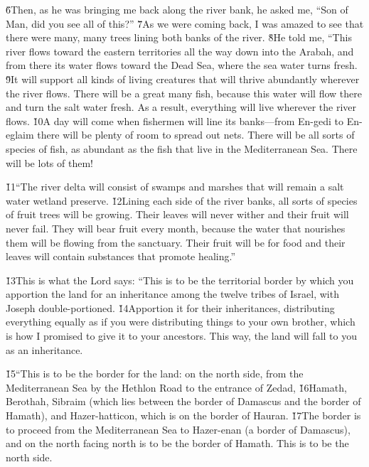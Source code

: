 \v{6}Then, as he was bringing me back along the river bank, he asked me, ``Son of Man, did you see all of this?'' \v{7}As we were coming back, I was amazed to see that there were many, many trees lining both banks of the river. \v{8}He told me, ``This river flows toward the eastern territories all the way down into the Arabah, and from there its water flows toward the Dead Sea, where the sea water turns fresh. \v{9}It will support all kinds of living creatures that will thrive abundantly wherever the river flows. There will be a great many fish, because this water will flow there and turn the salt water fresh. As a result, everything will live wherever the river flows. \v{10}A day will come when fishermen will line its banks---from En-gedi to En-eglaim there will be plenty of room to spread out nets. There will be all sorts of species of fish, as abundant as the fish that live in the Mediterranean Sea. There will be lots of them!

\v{11}``The river delta will consist of swamps and marshes that will remain a salt water wetland preserve. \v{12}Lining each side of the river banks, all sorts of species of fruit trees will be growing. Their leaves will never wither and their fruit will never fail. They will bear fruit every month, because the water that nourishes them will be flowing from the sanctuary. Their fruit will be for food and their leaves will contain substances that promote healing.''

\v{13}This is what the Lord  says: ``This is to be the territorial border by which you apportion the land for an inheritance among the twelve tribes of Israel, with Joseph double-portioned. \v{14}Apportion it for their inheritances, distributing everything equally as if you were distributing things to your own brother, which is how I promised to give it to your ancestors. This way, the land will fall to you as an inheritance.

\v{15}``This is to be the border for the land: on the north side, from the Mediterranean Sea by the Hethlon Road to the entrance of Zedad, \v{16}Hamath, Berothah, Sibraim (which lies between the border of Damascus and the border of Hamath), and Hazer-hatticon, which is on the border of Hauran. \v{17}The border is to proceed from the Mediterranean Sea to Hazer-enan (a border of Damascus), and on the north facing north is to be the border of Hamath. This is to be the north side.

